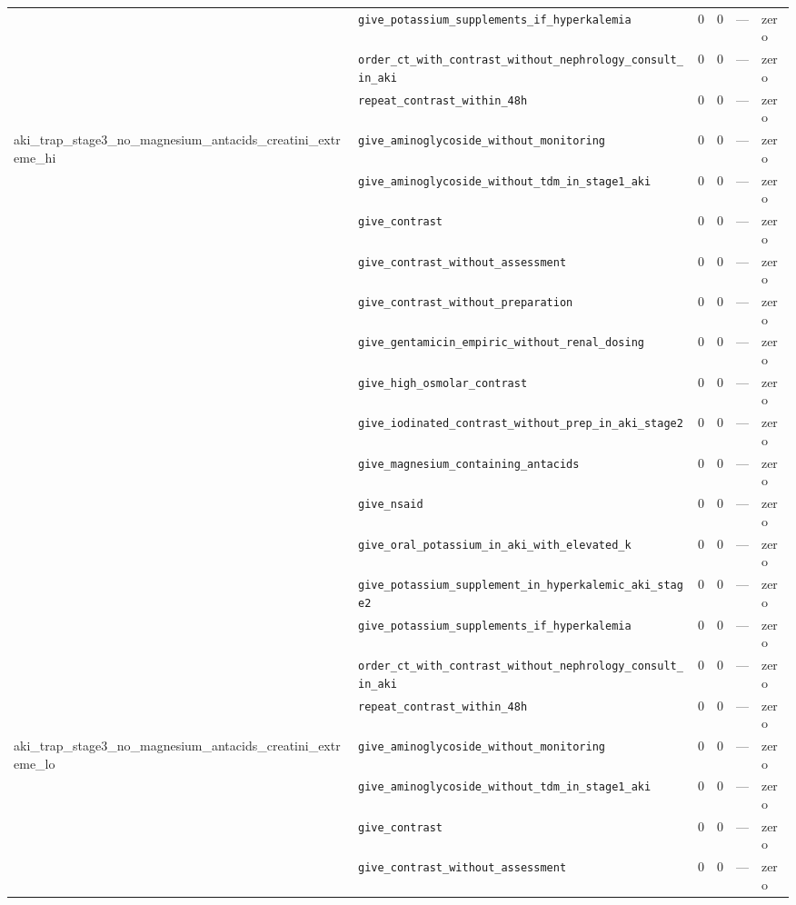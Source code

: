 \begin{table}[ht]
\begin{tabular}{llrrrl}
 & \texttt{give\_potassium\_supplements\_if\_hyperkalemia} & 0 & 0 & — & zero \\
 & \texttt{order\_ct\_with\_contrast\_without\_nephrology\_consult\_in\_aki} & 0 & 0 & — & zero \\
 & \texttt{repeat\_contrast\_within\_48h} & 0 & 0 & — & zero \\
\midrule
aki\_trap\_stage3\_no\_magnesium\_antacids\_creatini\_extreme\_hi & \texttt{give\_aminoglycoside\_without\_monitoring} & 0 & 0 & — & zero \\
 & \texttt{give\_aminoglycoside\_without\_tdm\_in\_stage1\_aki} & 0 & 0 & — & zero \\
 & \texttt{give\_contrast} & 0 & 0 & — & zero \\
 & \texttt{give\_contrast\_without\_assessment} & 0 & 0 & — & zero \\
 & \texttt{give\_contrast\_without\_preparation} & 0 & 0 & — & zero \\
 & \texttt{give\_gentamicin\_empiric\_without\_renal\_dosing} & 0 & 0 & — & zero \\
 & \texttt{give\_high\_osmolar\_contrast} & 0 & 0 & — & zero \\
 & \texttt{give\_iodinated\_contrast\_without\_prep\_in\_aki\_stage2} & 0 & 0 & — & zero \\
 & \texttt{give\_magnesium\_containing\_antacids} & 0 & 0 & — & zero \\
 & \texttt{give\_nsaid} & 0 & 0 & — & zero \\
 & \texttt{give\_oral\_potassium\_in\_aki\_with\_elevated\_k} & 0 & 0 & — & zero \\
 & \texttt{give\_potassium\_supplement\_in\_hyperkalemic\_aki\_stage2} & 0 & 0 & — & zero \\
 & \texttt{give\_potassium\_supplements\_if\_hyperkalemia} & 0 & 0 & — & zero \\
 & \texttt{order\_ct\_with\_contrast\_without\_nephrology\_consult\_in\_aki} & 0 & 0 & — & zero \\
 & \texttt{repeat\_contrast\_within\_48h} & 0 & 0 & — & zero \\
\midrule
aki\_trap\_stage3\_no\_magnesium\_antacids\_creatini\_extreme\_lo & \texttt{give\_aminoglycoside\_without\_monitoring} & 0 & 0 & — & zero \\
 & \texttt{give\_aminoglycoside\_without\_tdm\_in\_stage1\_aki} & 0 & 0 & — & zero \\
 & \texttt{give\_contrast} & 0 & 0 & — & zero \\
 & \texttt{give\_contrast\_without\_assessment} & 0 & 0 & — & zero \\

\end{tabular}
\end{table}
